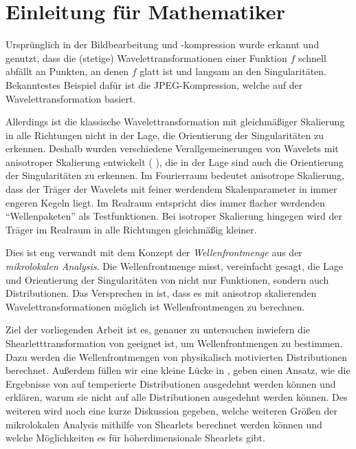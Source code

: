 \chapter{Einleitung für Mathematiker} %
\label{sec:einleitung_mathematik}

Ursprünglich in der Bildbearbeitung und -kompression wurde erkannt und genutzt, dass die (stetige) Wavelettransformationen einer Funktion $f$ schnell abfällt an Punkten, an denen $f$ glatt ist und langsam an den Singularitäten. Bekanntestes Beispiel dafür ist die JPEG-Kompression, welche auf der Wavelettransformation basiert.

Allerdings ist die klassische Wavelettransformation mit gleichmäßiger Skalierung in alle Richtungen nicht in der Lage, die Orientierung der Singularitäten zu erkennen. Deshalb wurden verschiedene Verallgemeinerungen von Wavelets mit anisotroper Skalierung entwickelt (\cite{Guo2006} \cite{Kutyniok2008} \cite{Candes2005}), die in der Lage sind auch die Orientierung der Singularitäten zu erkennen. Im Fourierraum bedeutet anisotrope Skalierung, dass der Träger der Wavelets mit feiner werdendem Skalenparameter in immer engeren Kegeln liegt. Im Realraum entspricht dies immer flacher werdenden "`Wellenpaketen"' als Testfunktionen. Bei isotroper Skalierung hingegen wird der Träger im Realraum in alle Richtungen gleichmäßig kleiner.

Dies ist eng verwandt mit dem Konzept der \emph{Wellenfrontmenge} aus der \emph{mikrolokalen Analysis}. Die Wellenfrontmenge misst, vereinfacht gesagt, die Lage und Orientierung der Singularitäten von nicht nur Funktionen, sondern auch Distributionen. Das Versprechen in \cite{Kutyniok2008} ist, dass es mit anisotrop skalierenden Wavelettransformationen möglich ist Wellenfrontmengen zu berechnen.

Ziel der vorliegenden Arbeit ist es, genauer zu untersuchen inwiefern die Shearletttransformation von \textcite{Kutyniok2008} geeignet ist, um Wellenfrontmengen zu bestimmen. Dazu werden die Wellenfrontmengen von physikalisch motivierten Distributionen berechnet. Außerdem füllen wir eine kleine Lücke in \cite{Kutyniok2008}, geben einen Ansatz, wie die Ergebnisse von \textcite{Kutyniok2008} auf temperierte Distributionen ausgedehnt werden können und erklären, warum sie nicht auf alle Distributionen ausgedehnt werden können.
Des weiteren wird noch eine kurze Diskussion gegeben, welche weiteren Größen der mikrolokalen Analysis mithilfe von Shearlets berechnet werden können und welche Möglichkeiten es für höherdimensionale Shearlets gibt.


